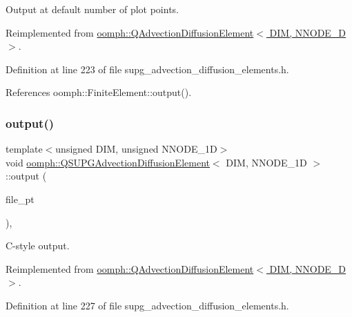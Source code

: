 Output at default number of plot points. 



Reimplemented from \hyperlink{classoomph_1_1QAdvectionDiffusionElement_af30152cc8ea671b103239fc6b3e506ce}{oomph\+::\+Q\+Advection\+Diffusion\+Element$<$ D\+I\+M, N\+N\+O\+D\+E\+\_\+D $>$}.



Definition at line 223 of file supg\+\_\+advection\+\_\+diffusion\+\_\+elements.\+h.



References oomph\+::\+Finite\+Element\+::output().

\mbox{\label{classoomph_1_1QSUPGAdvectionDiffusionElement_a57517d0b9c06ffee384f70fe587076c2}} 
\subsubsection{\texorpdfstring{output()}{output()}\hspace{0.1cm}{\footnotesize\ttfamily [3/4]}}
{\footnotesize\ttfamily template$<$unsigned D\+IM, unsigned N\+N\+O\+D\+E\+\_\+1D$>$ \\
void \hyperlink{classoomph_1_1QSUPGAdvectionDiffusionElement}{oomph\+::\+Q\+S\+U\+P\+G\+Advection\+Diffusion\+Element}$<$ D\+IM, N\+N\+O\+D\+E\+\_\+1D $>$\+::output (\begin{DoxyParamCaption}\item[{F\+I\+LE $\ast$}]{file\+\_\+pt }\end{DoxyParamCaption})\hspace{0.3cm}{\ttfamily [inline]}, {\ttfamily [virtual]}}



C-\/style output. 



Reimplemented from \hyperlink{classoomph_1_1QAdvectionDiffusionElement_a792f83bb2d8c22365cce60c43853396c}{oomph\+::\+Q\+Advection\+Diffusion\+Element$<$ D\+I\+M, N\+N\+O\+D\+E\+\_\+D $>$}.



Definition at line 227 of file supg\+\_\+advection\+\_\+diffusion\+\_\+elements.\+h.



